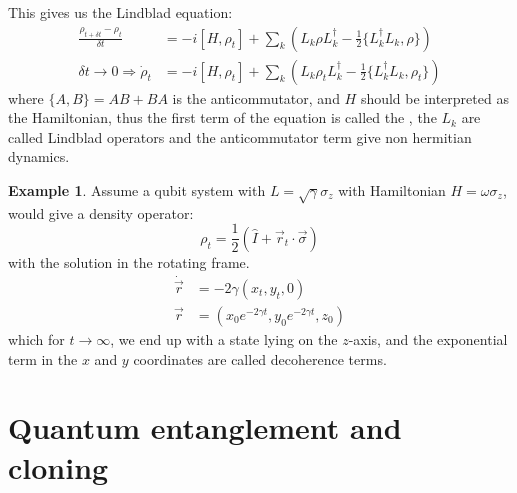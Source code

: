 \documentclass[12pt]{book}
\theoremstyle{definition}
\newtheorem*{example}{\bfseries Example}
\renewcommand{\v}[1]{\vec{#1}}
\newcommand{\de}{\delta}
\let\oldsum\sum
\renewcommand{\sum}[2]{\oldsum\limits_{#1}^{#2}}
\renewcommand{\to}{\longrightarrow}
\newcommand{\si}{\sigma}
\newcommand{\para}[1]{\left( {#1} \right)}
\begin{document}
This gives us the Lindblad equation:
\begin{align}
  \frac{\rho_{t + \de t} - \rho_t}{\de t} & = - i [H, \rho_t] + \oldsum_k \para{L_k \rho L_k^\dagger - \frac{1}{2} \{L_k^\dagger L_k, \rho\}} \nonumber\\
  \de t \to 0 \Longrightarrow \dot{\rho}_t & = - i [H, \rho_t] + \oldsum_k \para{L_k \rho_t L_k^\dagger - \frac{1}{2} \{L_k^\dagger L_k, \rho_t\}}
\end{align}
where $\{A, B\} = AB + BA$ is the anticommutator, and $H$ should be interpreted as the Hamiltonian, thus the first term of the equation is called the , the $L_k$ are called Lindblad operators and the anticommutator term give non hermitian dynamics.

\begin{example}
Assume a qubit system with $L = \sqrt{\gamma} \si_z$ with Hamiltonian $H = \omega \si_z$, would give a density operator:
\begin{equation*}
  \rho_t = \frac{1}{2} (\hat I + \v r_t \cdot \v \si)
\end{equation*}
with the solution in the rotating frame.
\begin{align*}
  \dot{\v r} & = - 2 \gamma (x_t, y_t, 0) \\
  \v r & = (x_0 e^{-2 \gamma t}, y_0 e^{-2 \gamma t}, z_0)
\end{align*}
which for $t \to \infty$, we end up with a state lying on the $z$-axis, and the exponential term in the $x$ and $y$ coordinates are called decoherence terms.
\end{example}


\chapter{Quantum entanglement and cloning}
\end{document}
